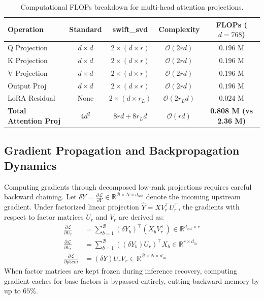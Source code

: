 \begin{table}[H]
\centering
\small
\begin{tabular}{lcccc}
\toprule
\textbf{Operation} & \textbf{Standard} & \textbf{swift\_svd} & \textbf{Complexity} & \textbf{FLOPs ($d=768$)} \\
\midrule
Q Projection & $d \times d$ & $2 \times (d \times r)$ & $\mathcal{O}(2rd)$ & $0.196$ M \\
K Projection & $d \times d$ & $2 \times (d \times r)$ & $\mathcal{O}(2rd)$ & $0.196$ M \\
V Projection & $d \times d$ & $2 \times (d \times r)$ & $\mathcal{O}(2rd)$ & $0.196$ M \\
Output Proj & $d \times d$ & $2 \times (d \times r)$ & $\mathcal{O}(2rd)$ & $0.196$ M \\
LoRA Residual & None & $2 \times (d \times r_L)$ & $\mathcal{O}(2r_L d)$ & $0.024$ M \\
\midrule
\textbf{Total Attention Proj} & $4 d^2$ & $8rd + 8r_L d$ & $\mathcal{O}(rd)$ & \textbf{0.808 M (vs 2.36 M)} \\
\bottomrule
\end{tabular}
\caption{Computational FLOPs breakdown for multi-head attention projections.}
\end{table}

\subsection{Gradient Propagation and Backpropagation Dynamics}
Computing gradients through decomposed low-rank projections requires careful backward chaining. Let $\delta Y = \frac{\partial \mathcal{L}}{\partial Y} \in \mathbb{R}^{\mathcal{B} \times N \times d_{\text{out}}}$ denote the incoming upstream gradient. Under factorized linear projection $\hat{Y} = X V_r^\top U_r^\top$, the gradients with respect to factor matrices $U_r$ and $V_r$ are derived as:
\begin{align}
\frac{\partial \mathcal{L}}{\partial U_r} &= \sum_{b=1}^{\mathcal{B}} (\delta Y_b)^\top (X_b V_r^\top) \in \mathbb{R}^{d_{\text{out}} \times r} \\
\frac{\partial \mathcal{L}}{\partial V_r} &= \sum_{b=1}^{\mathcal{B}} ((\delta Y_b) U_r)^\top X_b \in \mathbb{R}^{r \times d_{\text{in}}} \\
\frac{\partial \mathcal{L}}{\partial p{5cm}} &= (\delta Y) U_r V_r \in \mathbb{R}^{\mathcal{B} \times N \times d_{\text{in}}}
\end{align}
When factor matrices are kept frozen during inference recovery, computing gradient caches for base factors is bypassed entirely, cutting backward memory by up to $65\%$.

